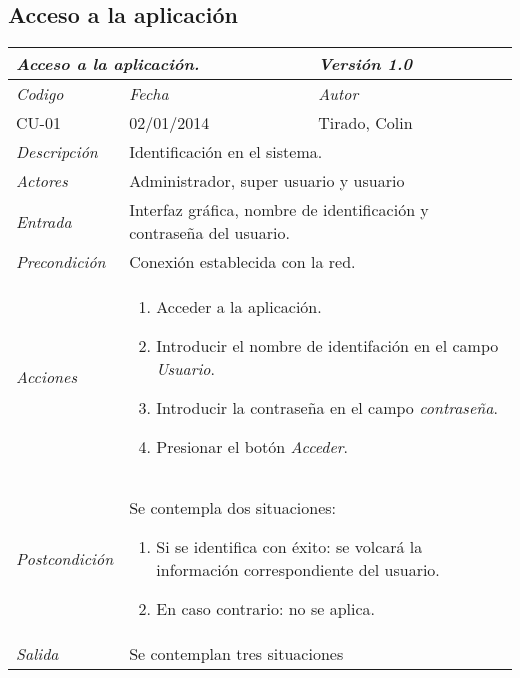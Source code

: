 \subsection{Acceso a la aplicaci\'on}

\begin{center}
    \begin{tabular}{|p{3cm}|p{4cm}|p{4cm}|p{4cm}|}
        \hline \multicolumn{3}{|p{9cm}|}{\textit{Acceso a la aplicaci\'on.}} & \textit{Versi\'on 1.0} \\
        \hline \textit{Codigo} & \textit{Fecha} & \multicolumn{2}{|p{6cm}|}{\textit{Autor}} \\
        CU-01 & 02/01/2014 & \multicolumn{2}{|p{6cm}|}{Tirado, Colin} \\
        \hline \textit{Descripci\'on} & \multicolumn{3}{|p{9cm}|}{Identificaci\'on en el sistema.} \\
        \hline \textit{Actores} & \multicolumn{3}{|p{9cm}|}{Administrador, super usuario y usuario} \\
        \hline \textit{Entrada} & \multicolumn{3}{|p{9cm}|}{Interfaz gr\'afica, nombre de identificaci\'on y contrase\~na del usuario.} \\
        \hline \textit{Precondici\'on} & \multicolumn{3}{|p{9cm}|}{Conexi\'on establecida con la red.} \\
        \hline \textit{Acciones} & \multicolumn{3}{|p{9cm}|}{
        \begin{enumerate}
            \item Acceder a la aplicaci\'on.
            \item Introducir el nombre de identifaci\'on en el campo \textit{Usuario}.
            \item Introducir la contrase\~na en el campo \textit{contrase\~na}.
            \item Presionar el bot\'on \textit{Acceder}.
        \end{enumerate}
        } \\
        \hline \textit{Postcondici\'on} & \multicolumn{3}{|p{9cm}|}{Se contempla dos situaciones:
        \begin{enumerate}
            \item Si se identifica con \'exito: se volcar\'a la informaci\'on correspondiente del usuario.
            \item En caso contrario: no se aplica.
        \end{enumerate}
        } \\
        \hline \textit{Salida} & \multicolumn{3}{|p{9cm}|}{Se contemplan tres situaciones
}
\end{tabular}
\end{center}
